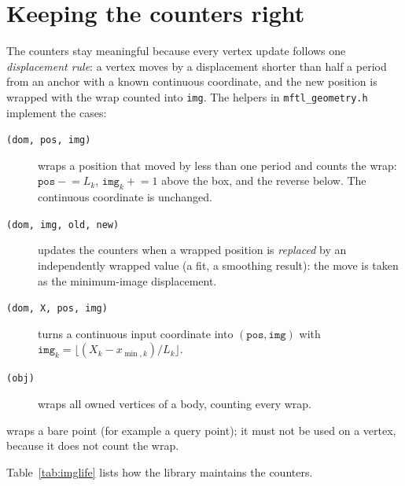 \section{Keeping the counters right}
\label{sec:displacement}

The counters stay meaningful because every vertex update follows one \emph{displacement rule}:
a vertex moves by a displacement shorter than half a period from an anchor with a known
continuous coordinate, and the new position is wrapped with the wrap counted into
\texttt{img}. The helpers in \texttt{mftl\_geometry.h} implement the cases:
\begin{description}
  \item[\texttt{(dom, pos, img)}] wraps a position that moved by less than one
    period and counts the wrap: $\texttt{pos}\mathrel{-}=L_k$, $\texttt{img}_k\mathrel{+}=1$ above the box,
    and the reverse below. The continuous coordinate is unchanged.
  \item[\texttt{(dom, img, old, new)}] updates the counters when a wrapped position
    is \emph{replaced} by an independently wrapped value (a fit, a smoothing result): the move is
    taken as the minimum-image displacement.
  \item[\texttt{(dom, X, pos, img)}] turns a continuous input coordinate
    into $(\texttt{pos},\texttt{img})$ with $\texttt{img}_k=\lfloor (X_k-x_{\min,k})/L_k\rfloor$.
  \item[\texttt{(obj)}] wraps all owned vertices of a body, counting
    every wrap.
\end{description}
 wraps a bare point (for example a query point); it must not be used on
a vertex, because it does not count the wrap.

Table~\ref{tab:imglife} lists how the library maintains the counters.

